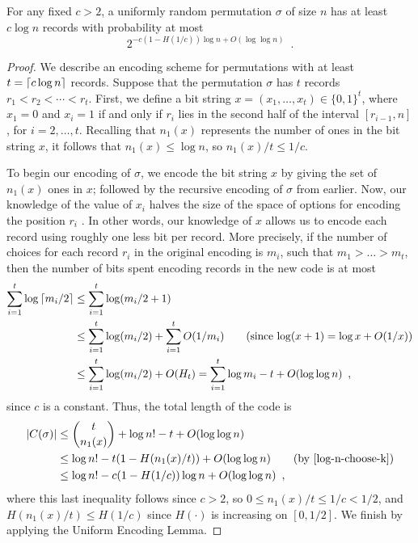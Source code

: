 \documentclass[format=acmsmall, review=false, screen=true]{acmart}
\begin{document}
\begin{thm}
  For any fixed $c > 2$, 
  a uniformly random permutation $\sigma$ of size $n$ has at least $c
  \log n$ records with probability at most
  \[
    2^{-c (1 - H(1/c)) \log n + O(\log \log n)}\enspace .
  \]
\end{thm}
\begin{proof}
We describe an encoding scheme for permutations with at least 
$t = {\lceil c \log n \rceil}$ records. 
Suppose that the permutation $\sigma$ has $t$ records
$r_1 < r_2 < \cdots < r_t$. First, we define a
bit string $x = (x_1, \dots, x_t) \in \{0, 1\}^t$, where $x_1 = 0$
and $x_i = 1$ if and only if $r_i$ lies in the second half of the
interval $[r_{i - 1}, n]$, for $i = 2, \dots, t$. 
Recalling that  $n_1(x)$ represents the 
number of ones in the bit string $x$, it follows that 
$n_1(x) \leq \log n$, so $n_1(x)/t \leq 1/c$.

To begin our encoding of $\sigma$, we encode the bit string $x$ by
giving the set of $n_1(x)$ ones in $x$; followed by the 
recursive encoding of $\sigma$ from earlier. Now, our knowledge of
the value of $x_i$ halves the size of the space of options for
encoding the position $r_i$ . In other words, our knowledge of $x$
allows us to encode each record using roughly one less bit per
record. More precisely, if the number of choices for each record
$r_i$ in the original encoding is $m_i$, such that $m_1 > \dots >
  m_t$, then the number of bits spent encoding records in the new code
  is at most
  \begin{align*}
    \sum_{i = 1}^t \log {\lceil m_i/2 \rceil} &\leq \sum_{i = 1}^t \log (m_i/2
                                       + 1)
    \\
                                     &\leq \sum_{i = 1}^t \log (m_i/2) + \sum_{i = 1}^t O(1/m_i) \tag{since $\log (x + 1) = \log x + O(1/x)$} \\
                                     &\leq \sum_{i = 1}^t \log (m_i/2) + O(H_t) 
                                     = \sum_{i = 1}^t \log
                                       m_i - t + O(\log \log n) \enspace ,
  \end{align*}
  since $c$ is a constant. Thus, the total length of the code is
  \begin{align*}
    |C(\sigma)| &\leq \binom{t}{n_1(x)} + \log n! - t + O(\log \log n) \\
                &\leq \log n! - t (1 - H(n_1(x)/t)) + O(\log \log n) \tag{by \eqref{log-n-choose-k}}\\
                &\leq \log n! - c (1 - H(1/c))\log n + O(\log \log n) \enspace ,
  \end{align*}
  where this last inequality follows since $c > 2$, so 
  $0 \leq n_1(x)/t \leq 1/c < 1/2$, and $H(n_1(x)/t)
  \leq H(1/c)$ since $H(\cdot)$ is increasing on $[0, 1/2]$. 
  We finish by applying the Uniform Encoding Lemma.
\end{proof}
\end{document}
